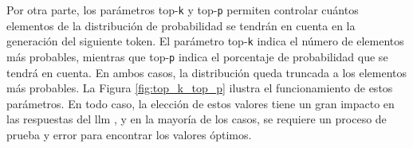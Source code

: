 Por otra parte, los parámetros top-\texttt{k} y top-\texttt{p} permiten controlar cuántos elementos de la distribución de probabilidad se tendrán en cuenta en la generación del siguiente token. El parámetro top-\texttt{k} indica el número de elementos más probables, mientras que top-\texttt{p} indica el porcentaje de probabilidad que se tendrá en cuenta. En ambos casos, la distribución queda truncada a los elementos más probables. La Figura \ref{fig:top_k_top_p} ilustra el funcionamiento de estos parámetros. En todo caso, la elección de estos valores tiene un gran impacto en las respuestas del \gls{llm} \citep{holtzmanCuriousCaseNeural2020,chamandFinetuneYourClassifier2022,wangHyperparameterOptimizationAlgorithm2022,wangCostEffectiveHyperparameterOptimization2023}, y en la mayoría de los casos, se requiere un proceso de prueba y error para encontrar los valores óptimos.


